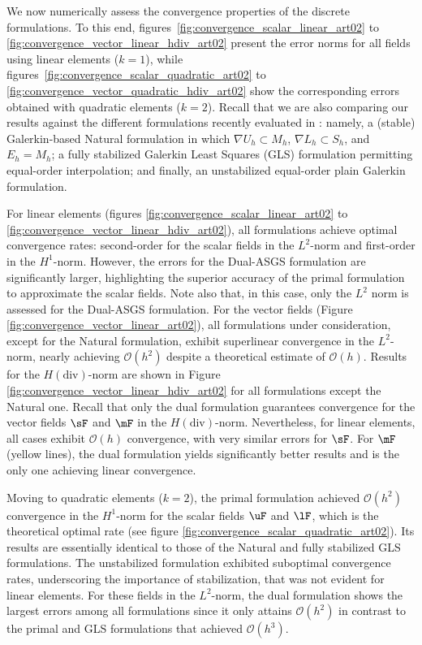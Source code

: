 We now numerically assess the convergence properties of the discrete formulations. To this end, figures~\ref{fig:convergence_scalar_linear_art02} to \ref{fig:convergence_vector_linear_hdiv_art02} present the error norms for all fields using linear elements ($k=1$), while figures~\ref{fig:convergence_scalar_quadratic_art02} to \ref{fig:convergence_vector_quadratic_hdiv_art02} show the corresponding errors obtained with quadratic elements ($k=2$). Recall that we are also comparing our results against the different formulations recently evaluated in \cite{Balbao2025}: namely, a (stable) Galerkin-based Natural formulation in which $\nabla{U}_h \subset M_h$, $\nabla{L}_h \subset S_h$, and $E_h = M_h$; a fully stabilized Galerkin Least Squares (GLS) formulation permitting equal-order interpolation; and finally, an unstabilized equal-order plain Galerkin formulation.

For linear elements (figures \ref{fig:convergence_scalar_linear_art02} to \ref{fig:convergence_vector_linear_hdiv_art02}), all formulations achieve optimal convergence rates: second-order for the scalar fields in the $L^2$-norm and first-order in the $H^1$-norm. However, the errors for the Dual-ASGS formulation are significantly larger, highlighting the superior accuracy of the primal formulation to approximate the scalar fields.
Note also that, in this case, only the $L^2$ norm is assessed for the Dual-ASGS formulation. For the vector fields (Figure \ref{fig:convergence_vector_linear_art02}), all formulations under consideration, except for the Natural formulation, exhibit superlinear convergence in the $L^2$-norm, nearly achieving $\mathcal{O}(h^2)$ despite a theoretical estimate of $\mathcal{O}(h)$.
Results for the $H(\text{div})$-norm are shown in Figure \ref{fig:convergence_vector_linear_hdiv_art02} for all formulations except the Natural one. Recall that only the dual formulation guarantees convergence for the vector fields $\sF$ and $\mF$ in the $H(\text{div})$-norm. Nevertheless, for linear elements, all cases exhibit $\mathcal{O}(h)$ convergence, with very similar errors for $\sF$. For $\mF$ (yellow lines), the dual formulation yields significantly better results and is the only one achieving linear convergence.

Moving to quadratic elements ($k=2$), the primal formulation achieved $\mathcal{O}(h^2)$ convergence in the $H^1$-norm for the scalar fields $\uF$ and $\lF$, which is the theoretical optimal rate (see figure \ref{fig:convergence_scalar_quadratic_art02}). Its results are essentially identical to those of the Natural and fully stabilized GLS formulations. The unstabilized formulation exhibited suboptimal convergence rates, underscoring the importance of stabilization, that was not evident for linear elements. For these fields in the $L^2$-norm, the dual formulation shows the largest errors among all formulations since it only attains $\mathcal{O}(h^2)$ in contrast to
the primal and GLS formulations that achieved $\mathcal{O}(h^3)$.

